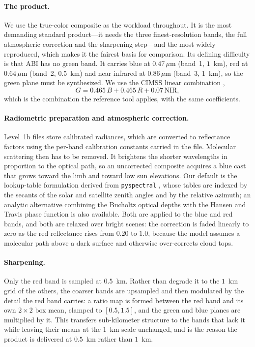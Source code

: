 \documentclass[11pt]{article}
\begin{document}
\paragraph{The product.}
We use the true-color composite as the workload throughout. It is the most
demanding standard product---it needs the three finest-resolution bands, the
full atmospheric correction and the sharpening step---and the most widely
reproduced, which makes it the fairest basis for comparison. Its defining
difficulty is that ABI has no green band. It carries blue at $0.47\,\mu$m
(band~1, $1$~km), red at $0.64\,\mu$m (band~2, $0.5$~km) and near infrared at
$0.86\,\mu$m (band~3, $1$~km), so the green plane must be synthesized. We use
the CIMSS linear combination \citep{Bah2018,Miller2016},
\[
G = 0.465\,B + 0.465\,R + 0.07\,\mathrm{NIR},
\]
which is the combination the reference tool applies, with the same
coefficients.

\paragraph{Radiometric preparation and atmospheric correction.}
Level~1b files store calibrated radiances, which are converted to reflectance
factors using the per-band calibration constants carried in the file. Molecular
scattering then has to be removed. It brightens the shorter wavelengths in
proportion to the optical path, so an uncorrected composite acquires a blue
cast that grows toward the limb and toward low sun elevations. Our default is
the lookup-table formulation derived from \texttt{pyspectral}
\citep{Scheirer2018,PySpectralLUT2018}, whose tables are indexed by the secants
of the solar and satellite zenith angles and by the relative azimuth; an
analytic alternative combining the Bucholtz optical depths
\citep{Bucholtz1995,Bodhaine1999} with the Hansen and Travis phase function
\citep{HansenTravis1974} is also available. Both are applied to the blue and
red bands, and both are relaxed over bright scenes: the correction is faded
linearly to zero as the red reflectance rises from $0.20$ to $1.0$, because the
model assumes a molecular path above a dark surface and otherwise
over-corrects cloud tops.

\paragraph{Sharpening.}
Only the red band is sampled at $0.5$~km. Rather than degrade it to the $1$~km
grid of the others, the coarser bands are upsampled and then modulated by the
detail the red band carries: a ratio map is formed between the red band and its
own $2 \times 2$ box mean, clamped to $[0.5, 1.5]$, and the green and blue
planes are multiplied by it. This transfers sub-kilometer structure to the
bands that lack it while leaving their means at the $1$~km scale unchanged, and
is the reason the product is delivered at $0.5$~km rather than $1$~km.
\end{document}
